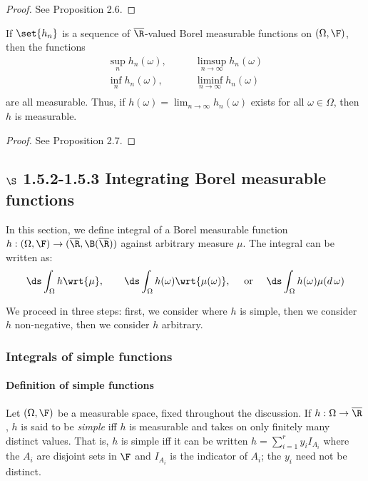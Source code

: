 \documentclass{article} %
\begin{document}
\begin{proof}
See \cite{folland1999real} Proposition 2.6.
\end{proof}

\begin{proposition}
If $\set{h_n}$ is a sequence of $\overline{\R}$-valued Borel measurable functions on $(\Omega, \F)$, then the functions
\begin{align*}
\sup_n h_n(\omega), & \quad \quad \limsup_{n \to \infty} h_n(\omega) \\
\inf_n h_n(\omega), & \quad \quad  \liminf_{n \to \infty} h_n(\omega) \\	
\end{align*}
are all measurable. Thus, if $h(\omega) = \lim_{n \to \infty} h_n(\omega)$ exists for all $\omega \in \Omega$, then $h$ is measurable.
\label{prop:borel_measurability_closed_under_inf_sup_liminf_limsup}
\end{proposition}

\begin{proof}
See \cite{folland1999real} Proposition 2.7.
\end{proof}

\subsection{$\S$ 1.5.2-1.5.3 Integrating  Borel measurable functions}

In this section, we define integral of a Borel measurable function $h : (\Omega, \F) \to (\overline{\R}, \B(\overline{\R}))$ against arbitrary measure $\mu$.  The integral can be written as:
\[ \ds\int_{\Omega} h \wrt{\mu}, \quad \quad \ds\int_{\Omega} h(\omega) \wrt{\mu(\omega)}, \quad \text{ or } \quad \ds\int_{\Omega} h(\omega) \mu(d \, \omega) \]
 
 We proceed in three steps: first, we consider where $h$ is simple, then we consider $h$ non-negative, then we consider $h$ arbitrary. 

\subsubsection{Integrals of simple functions}

\paragraph{Definition of simple functions} 

\begin{definition}
Let $(\Omega, \F)$ be a measurable space, fixed throughout the discussion.  If $h : \Omega \to \overline{\R}$, $h$ is said to be \textit{simple} iff $h$ is measurable and takes on only finitely many distinct values.  That is, $h$ is simple iff it can be written $h = \sum_{i=1}^r y_i I_{A_i}$ where the $A_i$ are disjoint sets in $\F$ and $I_{A_i}$ is the indicator of $A_i$; the $y_i$ need not be distinct. 
\label{def:simple_function}	
\end{definition}
\end{document}
